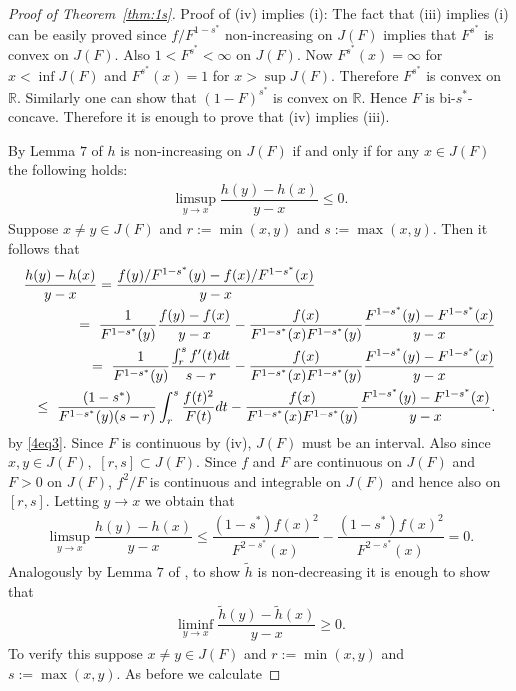 \documentclass[11pt]{amsart}
\numberwithin{equation}{section}
\newcommand{\RR}{\mathbb{R}}
\theoremstyle{definition}\newtheorem{definition}{Definition}
\theoremstyle{remark}\newtheorem{assumption}{Assumption}
\theoremstyle{remark}\newtheorem{remark}{Remark}
\theoremstyle{definition}\newtheorem{example}{Example}
\theoremstyle{plain}\newtheorem{question}{Question}
\theoremstyle{plain}\newtheorem{theorem}{Theorem}
\theoremstyle{plain}\newtheorem{lemma}{Lemma}
\theoremstyle{plain}\newtheorem{proposition}{Proposition}
\theoremstyle{plain}\newtheorem{corollary}{Corollary}
\theoremstyle{plain}\newtheorem{conjecture}{Conjecture}
\begin{document}
\begin{proof}[Proof of Theorem~\ref{thm:1s}]
Proof of (iv) implies (i):
 The fact that (iii) implies (i) can be easily proved  since $f/F^{1-s^*}$ non-increasing on 
 $J(F)$ implies that   $F^{s^*}$ is convex on $J(F).$ Also $1< F^{s^*}<\infty$ on $J(F)$.
 Now $F^{s^*}(x)=\infty$ for $x< \inf J(F)$ and $F^{s^*}(x)=1$ for $x> \sup J(F)$. 
 Therefore $F^{s^*}$ is convex on $\RR$.
 Similarly one can show that $(1-F)^{s^*}$ is convex on $\RR$.
 Hence $F$ is bi-$s^*$-concave. Therefore it is enough to prove that (iv) implies (iii).
 
 By Lemma $7$ of \cite{DuembgenKW:2017} $h$ is non-increasing on $J(F)$ 
 if and only if for any $x\in J(F)$ the following holds:
 \begin{eqnarray*}
 \limsup_{y\to x}\dfrac{h(y)-h(x)}{y-x}\leq 0.
 \end{eqnarray*}
 Suppose $x\neq y\in J(F)$ and $r:=\min(x,y)$ and $s:=\max(x,y).$ Then it follows that
 \begin{eqnarray*}
 \lefteqn{\dfrac{h(y)-h(x)}{y-x} =  \dfrac{f(y)/F^{1-s^*}(y)-f(x)/F^{1-s^*}(x)}{y-x}}\\
 && =\  \dfrac{1}{F^{1-s^*}(y)}\dfrac{f(y)-f(x)}{y-x}-\dfrac{f(x)}{F^{1-s^*}(x)F^{1-s^*}(y)}\dfrac{F^{1-s^*}(y)-F^{1-s^*}(x)}{y-x}\\
 && = \  \dfrac{1}{F^{1-s^*}(y)}\dfrac{\int_{r}^{s}f'(t)dt}{s-r}-\dfrac{f(x)}{F^{1-s^*}(x)F^{1-s^*}(y)}\dfrac{F^{1-s^*}(y)-F^{1-s^*}(x)}{y-x}\\
 && \leq \  \dfrac{(1-s^*)}{F^{1-s^*}(y)(s-r)}\int_{r}^{s}\dfrac{f(t)^2}{F(t)}dt-\dfrac{f(x)}{F^{1-s^*}(x)F^{1-s^*}(y)}\dfrac{F^{1-s^*}(y)-F^{1-s^*}(x)}{y-x}.
 \end{eqnarray*}
  by \eqref{4eq3}. 
  Since $F$ is continuous by (iv), $J(F)$ must be an interval. 
  Also since $x,y\in J(F),$ $[r,s]\subset J(F)$.  Since $f$ and $F$ are continuous on 
  $J(F)$ and $F>0$ on $J(F)$,  $f^2/F$ is continuous and integrable on $J(F)$ and hence also on $[r,s]$.    
  Letting $y\to x$ we obtain that
 \begin{eqnarray*}
 \limsup_{y\to x}\dfrac{h(y)-h(x)}{y-x}\leq \dfrac{(1-s^*)f(x)^2}{F^{2-s^*}(x)}-\dfrac{(1-s^*)f(x)^2}{F^{2-s^*}(x)}=0.
 \end{eqnarray*}
 Analogously by Lemma $7$ of \cite{DuembgenKW:2017}, to show $\tilde{h}$ is non-decreasing it is enough to show that
 \begin{eqnarray*}
 \liminf_{y\to x}\dfrac{\tilde{h}(y)-\tilde{h}(x)}{y-x}\geq 0.
 \end{eqnarray*}
 To verify this suppose $x\neq y\in J(F)$ and $r:=\min(x,y)$ and $s:=\max(x,y)$. 
 As before we calculate

\end{proof}
\end{document}
